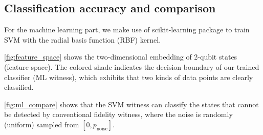 \documentclass[
aps,
pra,
twocolumn,
floatfix,
]{revtex4-2}
\theoremstyle{plain}
\theoremstyle{definition}
\newcommand{\noise}{\text{noise}}
\begin{document}
\subsection{Classification accuracy and comparison}

For the machine learning part, we make use of scikit-learning package \cite{pedregosaScikitlearnMachineLearning2011} to train SVM with the radial basis function (RBF) kernel.


\cref{fig:feature_space} shows the two-dimensional embedding of  2-qubit states (feature space).
The colored shade indicates the decision boundary of our trained classifier (ML witness),
which exhibits that two kinds of data points are clearly classified.


\cref{fig:ml_compare} shows that the SVM witness can classify the states that cannot be detected by conventional fidelity witness,
where the noise is randomly (uniform) sampled from $[0,p_{\noise}]$.
\end{document}
